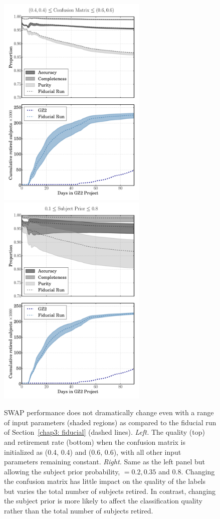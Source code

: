\begin{figure}
\includegraphics[width=2.8in]{Figures/human_machine/A1a.pdf}
\includegraphics[width=2.8in]{Figures/human_machine/A1b.pdf}
\caption[SWAP's performance is robust to changes in initial volunteer confusion matrix and subject prior.]{SWAP performance does not dramatically change even with a range of input parameters (shaded regions) as compared to the fiducial run of Section~\ref{chap3: fiducial} (dashed lines).  \textit{Left.} The quality (top) and retirement rate (bottom) when the confusion matrix is initialized as (0.4, 0.4) and (0.6, 0.6), with all other input parameters remaining constant. \textit{Right.} Same as the left panel but allowing the subject prior probability, \p $= 0.2, 0.35$ and $0.8$. Changing the confusion matrix has little impact on the quality of the labels but varies the total number of subjects retired. In contrast, changing the subject prior is more likely to affect the classification quality rather than the total number of subjects retired. \label{fig: tweak swap}}
\end{figure}

